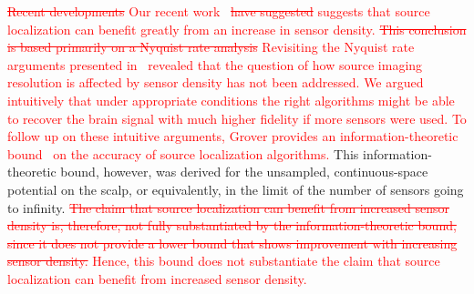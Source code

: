 \documentclass[conference,letterpaper]{IEEEtran}
\begin{document}
\textcolor{red}{
\sout{Recent developments} Our recent work~\cite{Grover2016Information}
\sout{have suggested} suggests that source localization can benefit greatly
from an increase in sensor density. \sout{This conclusion is based primarily on
	a Nyquist rate analysis} Revisiting the Nyquist rate arguments presented
in~\cite{Nunez2006Electric} revealed that the question of how source imaging
resolution is affected by sensor density has not been addressed. We argued
intuitively that under appropriate conditions the right algorithms might be
able to recover the brain signal with much higher fidelity if more sensors were
used. To follow up on these intuitive arguments, Grover provides an
information-theoretic bound~\cite{Grover2016Fundamental} on the accuracy of
source localization algorithms.} This information-theoretic bound, however, was
derived for the unsampled, continuous-space potential on the scalp, or
equivalently, in the limit of the number of sensors going to infinity. \textcolor{red}{\sout{The
claim that source localization can benefit from increased sensor density is,
therefore, not fully substantiated by the information-theoretic bound, since it
does not provide a lower bound that shows improvement with increasing sensor
density.} Hence, this bound does not substantiate the claim that source
localization can benefit from increased sensor density.}

\end{document}
